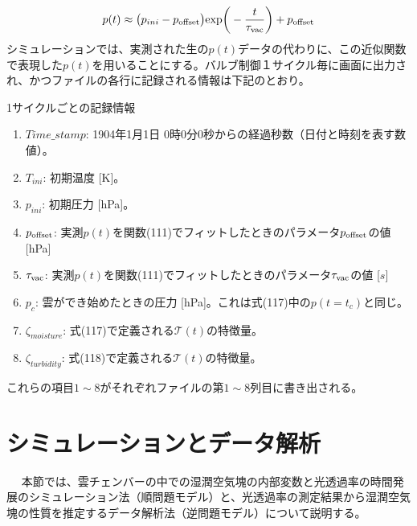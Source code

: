 \documentclass{jsarticle}
\begin{document}
\begin{equation}
 p(t)\approx {\big (}p_{ini}-p_{\rm offset}{\big )} {\rm exp}{\bigg (}- \frac{t}{\tau_{\rm vac}} {\bigg )}+ p_{\rm offset}
\end{equation}
シミュレーションでは、実測された生の$p(t)$データの代わりに、この近似関数で表現した$p(t)$を用いることにする。バルブ制御１サイクル毎に画面に出力され、かつファイルの各行に記録される情報は下記のとおり。
\\
\begin{itembox}[l]{1サイクルごとの記録情報}
\begin{enumerate}
\item ${Time \_ stamp}$: 1904年1月1日 0時0分0秒からの経過秒数（日付と時刻を表す数値）。
\item $T_{ini}$: 初期温度 [K]。
\item $p_{ini}$: 初期圧力 [hPa]。
\item $p_{\rm offset}$: 実測$p(t)$を関数(111)でフィットしたときのパラメータ$p_{\rm offset}$の値 [hPa]
\item $\tau_{\rm vac}$: 実測$p(t)$を関数(111)でフィットしたときのパラメータ$\tau_{\rm vac}$の値 [$s$]
\item $p_{c}$: 雲ができ始めたときの圧力 [hPa]。これは式(117)中の$p(t=t_{c})$と同じ。
\item $\zeta_{moisture}$: 式(117)で定義される$\mathcal{T}(t)$の特徴量。
\item $\zeta_{turbidity}$: 式(118)で定義される$\mathcal{T}(t)$の特徴量。
\end{enumerate}
\end{itembox}
これらの項目$1 \sim 8$がそれぞれファイルの第$1\sim 8$列目に書き出される。


\section{シミュレーションとデータ解析}　
本節では、雲チェンバーの中での湿潤空気塊の内部変数と光透過率の時間発展のシミュレーション法（順問題モデル）と、光透過率の測定結果から湿潤空気塊の性質を推定するデータ解析法（逆問題モデル）について説明する。
\end{document}
